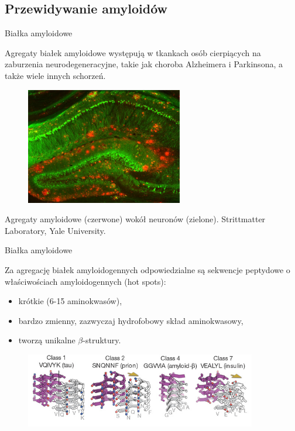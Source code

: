 \documentclass{beamer}\usepackage[]{graphicx}\usepackage[]{color}
\begin{document}
\subsection{Przewidywanie amyloidów}

\begin{frame}{Białka amyloidowe}

Agregaty białek amyloidowe występują w tkankach osób cierpiących na zaburzenia 
neurodegeneracyjne, takie jak choroba Alzheimera i Parkinsona, a także wiele innych 
schorzeń.

\begin{figure} 
\includegraphics[width=0.61\textwidth]{static_figure/amyloid_aggregates.jpg}
\end{figure}

\footnotesize
Agregaty amyloidowe (czerwone) wokół neuronów (zielone). Strittmatter Laboratory, Yale University.

\end{frame}  

  
\begin{frame}{Białka amyloidowe}

Za agregację białek amyloidogennych odpowiedzialne są sekwencje peptydowe o właściwościach amyloidogennych (hot spots):

\begin{itemize}
\item krótkie (6-15 aminokwasów),
\item bardzo zmienny, zazwyczaj hydrofobowy skład aminokwasowy,
\item tworzą unikalne $\beta$-struktury.
\end{itemize}

\begin{figure} 
\includegraphics[width=0.9\textwidth]{static_figure/zipper_structure.jpg}
\end{figure}

\footnotesize\citet{sawaya_atomic_2007}
\end{frame}
\end{document}
